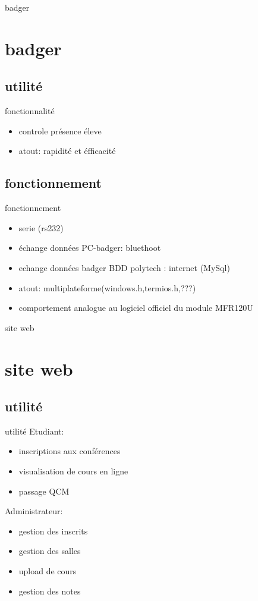 \documentclass{beamer}
\begin{document}
\begin{frame}{badger}
 \section{badger}
  \subsection{utilité}
	\begin{block}{fonctionnalité}
		\begin{itemize}
			\item controle présence éleve
			\item atout: rapidité et éfficacité
		\end{itemize}
	\end{block}

 \subsection{fonctionnement}
	\begin{block}{fonctionnement}
		\begin{itemize}
			\item serie (rs232)
			\item échange données PC-badger: bluethoot
			\item echange données badger BDD polytech : internet (MySql)
			\item atout: multiplateforme(windows.h,termios.h,???)
			\item comportement analogue au logiciel officiel du module MFR120U
		\end{itemize}
	\end{block}

\end{frame}

\begin{frame}{site web}
 \section{site web}
  \subsection{utilité}
	\begin{block}{utilité}
		Etudiant:
		\begin{itemize}
			\item inscriptions aux conférences
			\item visualisation de cours en ligne
			\item passage QCM
		\end{itemize}
		Administrateur:		
		\begin{itemize}
			\item gestion des inscrits
			\item gestion des salles
			\item upload de cours
			\item gestion des notes
		\end{itemize}
	\end{block}
			
\end{frame}
\end{document}
